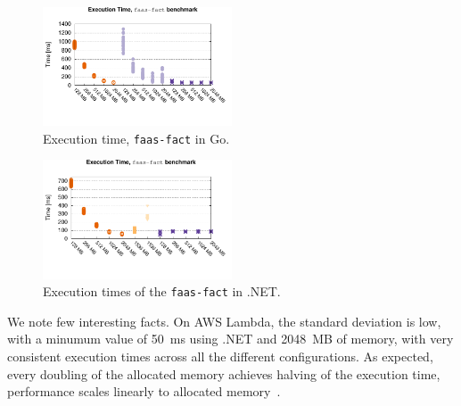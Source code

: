 \begin{figure}[!t]
\centering
\includegraphics[width=0.5\textwidth, trim={0 40 0 0}]{bilder/general_go/cpufact.pdf}
\caption{Execution time, \texttt{faas-fact} in Go.}
\label{fig:general_go_plot}
\end{figure}

\begin{figure}[!t]
\centering
\includegraphics[width=0.5\textwidth, trim={0 40 0 0}]{bilder/general_dotnet/cpufact.pdf}
\caption{Execution times of the \texttt{faas-fact} in .NET.}
\label{fig:general_dotnet_plot}
\end{figure}

We note few interesting facts.
On \gls{AWS} Lambda, the standard deviation is low, with a minumum value of 50~ms using .NET and  2048~MB of memory, with very consistent execution times across all the different configurations. 
As expected, every doubling of the allocated memory achieves halving of the execution time, performance scales linearly to allocated memory~\cite{AWSLambdaConfig}. 

